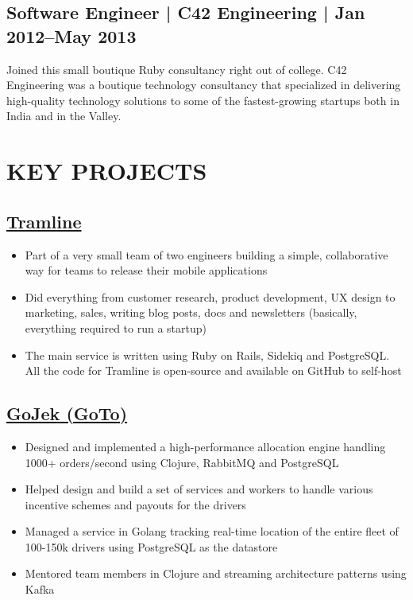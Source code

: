 \documentclass[11pt,a4paper]{article}
\begin{document}
\subsection*{Software Engineer | C42 Engineering | Jan 2012--May 2013}
Joined this small boutique Ruby consultancy right out of college. C42 Engineering was a boutique technology consultancy that specialized in delivering high-quality technology solutions to some of the fastest-growing startups both in India and in the Valley.

\section*{KEY PROJECTS}

\subsection*{\href{https://github.com/tramlinehq/tramline}{Tramline}}
\begin{itemize}
    \item Part of a very small team of two engineers building a simple, collaborative way for teams to release their mobile applications
    \item Did everything from customer research, product development, UX design to marketing, sales, writing blog posts, docs and newsletters (basically, everything required to run a startup)
    \item The main service is written using Ruby on Rails, Sidekiq and PostgreSQL. All the code for Tramline is open-source and available on GitHub to self-host
\end{itemize}

\subsection*{\href{https://www.gojek.io}{GoJek (GoTo)}}
\begin{itemize}
  \item Designed and implemented a high-performance allocation engine handling 1000+ orders/second using Clojure, RabbitMQ and PostgreSQL
  \item Helped design and build a set of services and workers to handle various incentive schemes and payouts for the drivers
  \item Managed a service in Golang tracking real-time location of the entire fleet of 100-150k drivers using PostgreSQL as the datastore
  \item Mentored team members in Clojure and streaming architecture patterns using Kafka
\end{itemize}
\end{document}
